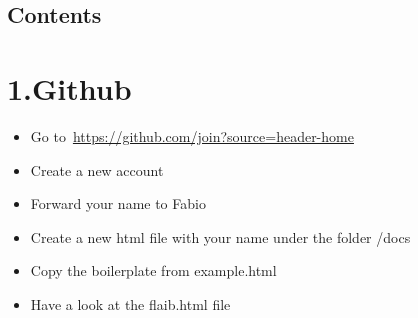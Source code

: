 \documentclass{article}
\begin{document}
\begin{mdtoc}%

\section*{Contents}\label{sec-contents}%

\begin{mdtocblock}%





\end{mdtocblock}%
\end{mdtoc}%

\mdxtitleblockstart{}
\mdxauthorstart{}
\mdxauthorend\mdtitleauthorrunning{}{}\mdxtitleblockend%

\section{1.\hspace*{0.5em}Github}\label{sec-github}%

\begin{itemize}[noitemsep,topsep=\mdcompacttopsep]%

\item{}Go to~\href{https://github.com/join?source=header-home}{https://github.com/join?source=header-home}%

\item{}Create a new account%

\item{}Forward your name to Fabio%

\item{}Create a new html file with your name under the folder /docs%

\item{}Copy the boilerplate from example.html%

\item{}Have a look at the flaib.html file%
\end{itemize}%
\end{document}
